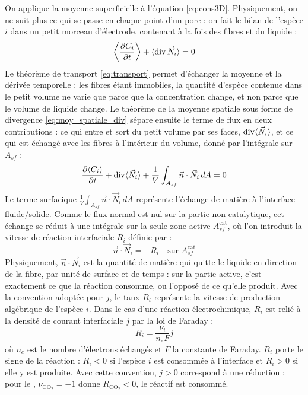 On applique la moyenne superficielle à l'équation \eqref{eq:cons3D}.
Physiquement, on ne suit plus ce qui se passe en chaque point d'un pore : on
fait le bilan de l'espèce $i$ dans un petit morceau d'électrode, contenant à
la fois des fibres et du liquide :
\begin{equation}
\left\langle \frac{\partial C_i}{\partial t} \right\rangle + \langle \operatorname{div} \vec{N}_i \rangle = 0
\label{eq:cons1D}
\end{equation}
Le théorème de transport \eqref{eq:transport} permet d'échanger la moyenne et
la dérivée temporelle : les fibres étant immobiles, la quantité d'espèce
contenue dans le petit volume ne varie que parce que la concentration change,
et non parce que le volume de liquide change. Le théorème de la moyenne
spatiale sous forme de divergence \eqref{eq:moy_spatiale_div} sépare ensuite
le terme de flux en deux contributions : ce qui entre et sort du petit volume
par ses faces, $\operatorname{div}\langle \vec{N}_i \rangle$, et ce qui est échangé avec les fibres à
l'intérieur du volume, donné par l'intégrale sur $A_{sf}$ :
\begin{equation}
\frac{\partial \langle C_i \rangle}{\partial t} + \operatorname{div} \langle \vec{N}_i \rangle + \frac{1}{V}\int_{A_{sf}} \vec{n} \cdot \vec{N}_i\, dA = 0
\end{equation}
Le terme surfacique $\frac{1}{V}\int_{A_{sf}} \vec{n}\cdot \vec{N}_i\, dA$
représente l'échange de matière à l'interface fluide/solide. Comme le flux
normal est nul sur la partie non catalytique, cet échange se réduit à une
intégrale sur la seule zone active $A_{sf}^{\mathrm{cat}}$, où l'on introduit
la vitesse de réaction interfaciale $R_i$ définie par :
\begin{equation}
\vec{n}\cdot \vec{N}_i = -R_i \quad \text{sur } A_{sf}^{\mathrm{cat}}
\end{equation}
Physiquement, $\vec{n}\cdot\vec{N}_i$ est la quantité de matière qui quitte le
liquide en direction de la fibre, par unité de surface et de temps : sur la
partie active, c'est exactement ce que la réaction consomme, ou l'opposé de
ce qu'elle produit.
Avec la convention adoptée pour $j$, le taux $R_i$ représente la vitesse de
production algébrique de l'espèce $i$. Dans le cas d'une réaction
électrochimique, $R_i$ est relié à la densité de courant interfaciale $j$ par
la loi de Faraday :
\begin{equation}
R_i =\frac{\nu_i}{n_e F} j
\end{equation}
où $n_e$ est le nombre d’électrons échangés et $F$ la constante de Faraday.
$R_i$ porte le signe de la réaction : $R_i < 0$ si l'espèce $i$ est
consommée à l'interface et $R_i > 0$ si elle y est produite.
Avec cette convention, $j > 0$ correspond à une réduction : pour le
, $\nu_{\mathrm{CO_2}} = -1$ donne $R_{\mathrm{CO_2}} < 0$, le
réactif est consommé.


